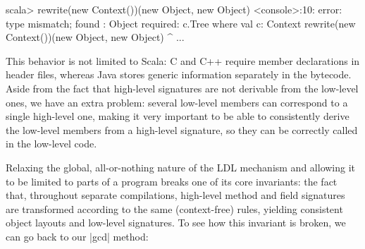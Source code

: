 \begin{lstlisting-nobreak}
scala> rewrite(new Context())(new Object, new Object)
<console>:10: error: type mismatch;
 found   : Object
 required: c.Tree where val c: Context
              rewrite(new Context())(new Object, new Object)
                                     ^
...
\end{lstlisting-nobreak}

This behavior is not limited to Scala: C and C++ require member declarations in header files, whereas Java stores generic information separately in the bytecode. Aside from the fact that high-level signatures are not derivable from the low-level ones, we have an extra problem: several low-level members can correspond to a single high-level one, making it very important to be able to consistently derive the low-level members from a high-level signature, so they can be correctly called in the low-level code.

Relaxing the global, all-or-nothing nature of the LDL mechanism and allowing it to be limited to parts of a program breaks one of its core invariants: the fact that, throughout separate compilations, high-level method and field signatures are transformed according to the same (context-free) rules, yielding consistent object layouts and low-level signatures.
%
%
%
%
%
%
To see how this invariant is broken, we can go back to our |gcd| method:

